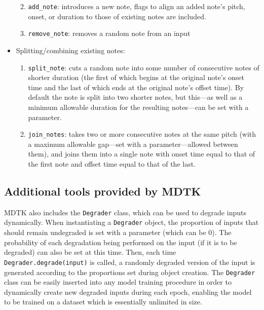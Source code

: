 \documentclass[12pt,a4paper,]{report}
\providecommand{\tightlist}{%
  \setlength{\itemsep}{0pt}\setlength{\parskip}{0pt}}
\begin{document}
\begin{itemize}
  \begin{enumerate}
  \def\labelenumi{\arabic{enumi}.}
  \setcounter{enumi}{4}
  \tightlist
  \item
    \texttt{add\_note}: introduces a new note, flags to align an added
    note's pitch, onset, or duration to those of existing notes are
    included.
  \item
    \texttt{remove\_note}: removes a random note from an input
  \end{enumerate}
\item
  Splitting/combining existing notes:

  \begin{enumerate}
  \def\labelenumi{\arabic{enumi}.}
  \setcounter{enumi}{6}
  \tightlist
  \item
    \texttt{split\_note}: cuts a random note into some number of
    consecutive notes of shorter duration (the first of which begins at
    the original note's onset time and the last of which ends at the
    original note's offset time). By default the note is split into two
    shorter notes, but this---as well as a minimum allowable duration
    for the resulting notes---can be set with a parameter.
  \item
    \texttt{join\_notes}: takes two or more consecutive notes at the
    same pitch (with a maximum allowable gap---set with a
    parameter---allowed between them), and joins them into a single note
    with onset time equal to that of the first note and offset time
    equal to that of the last.
  \end{enumerate}
\end{itemize}

\hypertarget{additional-tools-provided-by-mdtk}{%
\subsection{Additional tools provided by
MDTK}\label{additional-tools-provided-by-mdtk}}

MDTK also includes the \texttt{Degrader} class, which can be used to
degrade inputs dynamically. When instantiating a \texttt{Degrader}
object, the proportion of inputs that should remain undegraded is set
with a parameter (which can be 0). The probability of each degradation
being performed on the input (if it is to be degraded) can also be set
at this time. Then, each time \texttt{Degrader.degrade(input)} is
called, a randomly degraded version of the input is generated according
to the proportions set during object creation. The \texttt{Degrader}
class can be easily inserted into any model training procedure in order
to dynamically create new degraded inputs during each epoch, enabling
the model to be trained on a dataset which is essentially unlimited in
size.
\end{document}
